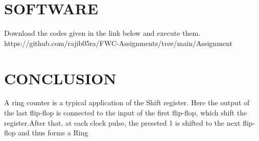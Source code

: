 \documentclass[conference]{IEEEtran}
\begin{document}
\section{SOFTWARE}
Download the codes given in the link below and execute them.
https://github.com/rajib05ra/FWC-Assignments/tree/main/Assignment%

\section{CONCLUSION}
A ring counter is a typical application of the Shift register. Here the output of the last flip-flop is connected to the input of the first flip-flop, which shift the register.After that, at each clock pulse, the preseted 1 is shifted to the next flip-flop and thus forms a Ring
\end{document}
